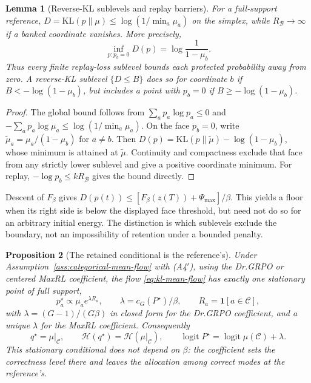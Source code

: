 \documentclass{article}
\newcommand{\1}{\mathbf 1}
\newtheorem{lemma}{Lemma}[section]
\newtheorem{proposition}[lemma]{Proposition}
\theoremstyle{remark}
\theoremstyle{definition}
\theoremstyle{plain}
\begin{document}
\begin{lemma}[Reverse-KL sublevels and replay barriers]
\label{lem:kl-no-barrier}
For a full-support reference,
$D=\mathrm{KL}(p\|\mu)\le\log(1/\min_a\mu_a)$ on the simplex, while
$R_{\mathcal B}\to\infty$ if a banked coordinate vanishes. More precisely,
\[
 \inf_{p:p_b=0}D(p)=\log\frac1{1-\mu_b}.
\]
Thus every finite replay-loss sublevel bounds each protected probability
away from zero. A reverse-KL sublevel $\{D\le B\}$ does so for coordinate $b$
if $B<-\log(1-\mu_b)$, but includes a point with $p_b=0$ if
$B\ge-\log(1-\mu_b)$.
\end{lemma}
\begin{proof}
The global bound follows from $\sum_ap_a\log p_a\le0$ and
$-\sum_ap_a\log\mu_a\le\log(1/\min_a\mu_a)$.
On the face $p_b=0$, write $\widetilde\mu_a=\mu_a/(1-\mu_b)$ for $a\ne b$.
Then $D(p)=\mathrm{KL}(p\|\widetilde\mu)-\log(1-\mu_b)$, whose minimum is
attained at $\widetilde\mu$. Continuity and compactness exclude that face
from any strictly lower sublevel and give a positive coordinate minimum.
For replay, $-\log p_b\le kR_{\mathcal B}$ gives the bound directly.
\end{proof}

Descent of $F_\beta$ gives
$D(p(t))\le [F_\beta(z(T))+\Psi_{\max}]/\beta$.
This yields a floor when its right side is below the displayed face
threshold, but need not do so for an arbitrary initial energy. The distinction
is which sublevels exclude the boundary, not an impossibility of retention
under a bounded penalty.

\begin{proposition}[The retained conditional is the reference's]
\label{prop:kl-stationary}
Under Assumption~\ref{ass:categorical-mean-flow} with (A4$'$), using the
Dr.GRPO or centered MaxRL coefficient, the flow
\eqref{eq:kl-mean-flow} has exactly one stationary point of full support,
\[
  p^\star_a\propto\mu_ae^{\lambda R_a},
  \qquad
  \lambda=c_G(P^\star)/\beta,
  \qquad
  R_a=\1[a\in\mathcal C],
\]
with $\lambda=(G-1)/(G\beta)$ in closed form for the Dr.GRPO coefficient, and
a unique $\lambda$ for the MaxRL coefficient. Consequently
\[
  q^\star=\mu|_{\mathcal C},
  \qquad
  \mathcal H(q^\star)=\mathcal H(\mu|_{\mathcal C}),
  \qquad
  \operatorname{logit}P^\star=\operatorname{logit}\mu(\mathcal C)+\lambda .
\]
This stationary conditional does not depend on $\beta$: the coefficient sets
the correctness level there and leaves the allocation among correct modes at
the reference's.
\end{proposition}
\end{document}
